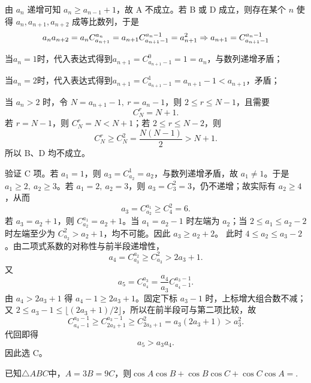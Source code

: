 \begin{solution}
由 $a_n$ 递增可知 $a_n\ge a_{n-1}+1$，故 A 不成立。若 B 或 D 成立，则存在某个 $n$ 使得 $a_n,a_{n+1},a_{n+2}$ 成等比数列，于是
\[
    a_na_{n+2} = a_nC_{a_{n+1}}^{a_{n}}=a_{n+1}C_{a_{n+1}-1}^{a_{n}-1}=a_{n+1}^2\\\Rightarrow a_{n+1}=C_{a_{n+1}-1}^{a_{n}-1}
\]

当$a_n=1$时，代入表达式得到$a_{n+1}=C_{a_{n+1}-1}^{0}=1=a_n$，与数列递增矛盾；

当$a_n=2$时，代入表达式得到$a_{n+1}=C_{a_{n+1}-1}^{1}=a_{n+1}-1<a_{n+1}$，矛盾；

当 $a_n>2$ 时，令 $N=a_{n+1}-1,\ r=a_n-1$，则 $2\le r\le N-1$，且需要
\[
C_N^r=N+1.
\]
若 $r=N-1$，则 $C_N^r=N<N+1$；若 $2\le r\le N-2$，则
\[
C_N^r\ge C_N^2=\frac{N(N-1)}2>N+1.
\]
所以 B、D 均不成立。

验证 C 项。若 $a_1=1$，则 $a_3=C_{a_2}^{1}=a_2$，与数列递增矛盾，故 $a_1\ne1$。于是 $a_1\ge2,\ a_2\ge3$。若 $a_1=2,\ a_2=3$，则 $a_3=C_3^2=3$，仍不递增；故实际有 $a_2\ge4$，从而
\[
a_3=C_{a_2}^{a_1}\ge C_4^2=6.
\]
若 $a_3=a_2+1$，则 $C_{a_2}^{a_1}=a_2+1$。当 $a_1=a_2-1$ 时左端为 $a_2$；当 $2\le a_1\le a_2-2$ 时左端至少为 $C_{a_2}^{2}>a_2+1$，均不可能。因此 $a_3\ge a_2+2$。
此时 $4\le a_2\le a_3-2$。由二项式系数的对称性与前半段递增性，
\[
a_4=C_{a_3}^{a_2}\ge C_{a_3}^{2}>2a_3+1.
\]
又
\[
a_5=C_{a_4}^{a_3}=\frac{a_4}{a_3}C_{a_4-1}^{a_3-1}.
\]
由 $a_4>2a_3+1$ 得 $a_4-1\ge2a_3+1$。固定下标 $a_3-1$ 时，上标增大组合数不减；又 $2\le a_3-1\le \lfloor(2a_3+1)/2\rfloor$，所以在前半段可与第二项比较，故
\[
C_{a_4-1}^{a_3-1}\ge C_{2a_3+1}^{a_3-1}\ge C_{2a_3+1}^{2}=a_3(2a_3+1)>a_3^2.
\]
代回即得
\[
a_5>a_3a_4.
\]
因此选 C。
\end{solution}
\begin{example}
    已知$\triangle{ABC}$中，$A=3B=9C$，则$\cos A\cos B+\cos B\cos C+\cos C\cos A=$\underline{\hspace{1cm}}.
\end{example}
